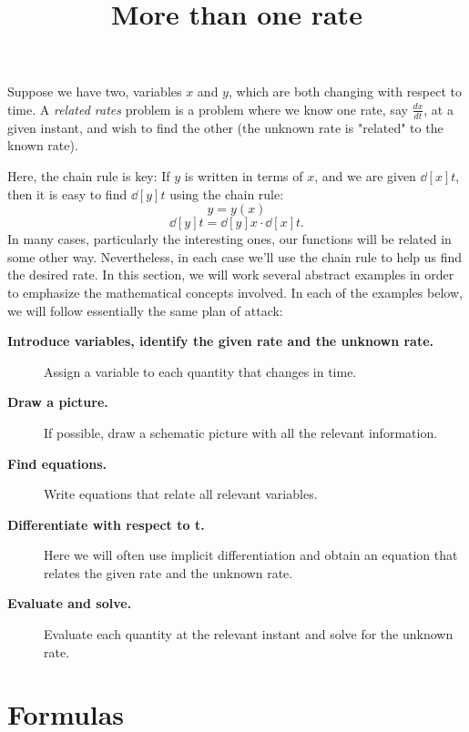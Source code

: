 \documentclass{ximera}
\title{More than one rate}
\begin{document}
	\begin{abstract}

	\end{abstract}
	\maketitle
	
	
	Suppose we have two, variables $x$ and $y$, which are both changing with
	respect to time.  A \textit{related rates} problem is a problem where
	we know one rate, say $\frac{dx}{dt}$, at a given instant, and wish to find the other (the unknown rate is "related" to the known rate).
	
	Here, the chain rule is key: If $y$ is written in terms of $x$, and we
	are given $\dd[x]{t}$, then it is easy to find $\dd[y]{t}$ using the
	chain rule:
	\[
	y=y(x)
	\]
	\[
	\dd[y]{t}=\dd[y]{x}\cdot \dd[x]{t}.
	\]
	In many cases, particularly the interesting ones, our functions will
	be related in some other way. Nevertheless, in each case we'll use the
	chain rule to help us find the desired rate. In this
	section, we will work several abstract examples in order to emphasize
	the mathematical concepts involved. In each of the examples below, we
	will follow essentially the same plan of attack:
	
	
	
	\begin{description}
		\item[\textbf{Introduce variables, identify the given rate and the unknown rate.}]
		
		Assign a variable to each quantity that changes in time.
		\item[\textbf{Draw a picture.}] If possible, draw a schematic picture with all the relevant information. 
		\item[\textbf{Find equations.}] Write equations that relate all
		relevant variables.
		\item[\textbf{Differentiate with respect to t.}] Here we will often use
		implicit differentiation and obtain an equation that relates the given rate and the unknown rate. 
		\item[\textbf{Evaluate and solve.}] Evaluate
		each quantity at the relevant instant and solve for the unknown rate.
		
	\end{description}
	
	
	
	
	\section{Formulas}
	
\end{document}
